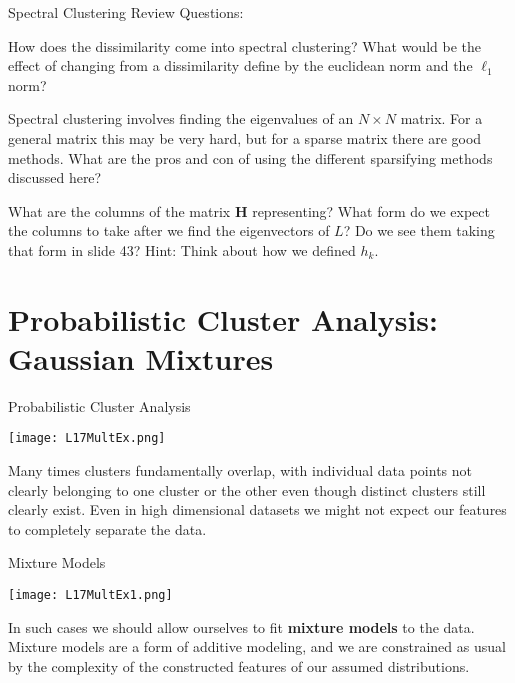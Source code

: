 \documentclass[10pt, table, dvipsnames,xcdraw,handout]{beamer}
\begin{document}
\begin{frame}[fragile]{Spectral Clustering}
Review Questions:

How does the dissimilarity come into spectral clustering? What would be the effect of changing from a dissimilarity define by the euclidean norm and the $\ell_1$ norm?

Spectral clustering involves finding the eigenvalues of an $N\times N$ matrix. For a general matrix this may be very hard, but for a sparse matrix there are good methods. What are the pros and con of using the different sparsifying methods discussed here?

What are the columns of the matrix $\mathbf{H}$ representing? What form do we expect the columns to take after we find the eigenvectors of $L$? Do we see them taking that form in slide 43? Hint: Think about how we defined $h_k$. 

\end{frame}



\section{Probabilistic Cluster Analysis: Gaussian Mixtures}


\begin{frame}[fragile]{Probabilistic Cluster Analysis}
  \begin{minipage}[t][0.5\textheight][t]{\textwidth}
	\centering \texttt{[image: L17MultEx.png]}
  \end{minipage}
  \vfill
\begin{minipage}[t][0.5\textheight][t]{\textwidth}
Many times clusters fundamentally overlap, with individual data points not clearly belonging to one cluster or the other even though distinct clusters still clearly exist. \pause Even in high dimensional datasets we might not expect our features to completely separate the data. 
\end{minipage}
\end{frame}


\begin{frame}[fragile]{Mixture Models}
  \begin{minipage}[t][0.5\textheight][t]{\textwidth}
	\centering \texttt{[image: L17MultEx1.png]}
  \end{minipage}
  \vfill
\begin{minipage}[t][0.5\textheight][t]{\textwidth}
In such cases we should allow ourselves to fit \textbf{mixture models} to the data. Mixture models are a form of additive modeling, and we are constrained as usual by the complexity of the constructed features of our assumed distributions. 
\end{minipage}
\end{frame}
\end{document}
